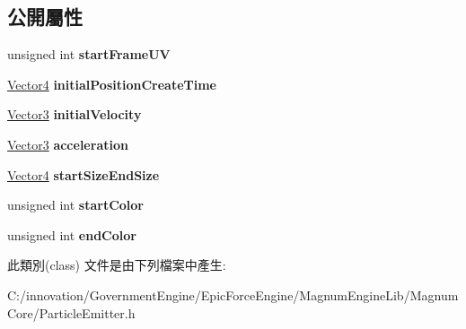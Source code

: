 \subsection*{公開屬性}
\begin{DoxyCompactItemize}
\item 
unsigned int {\bfseries start\+Frame\+UV}\hypertarget{class_i_dream_sky_1_1_particle_emitter_1_1_vertex_a35e593a2585b7fd686b5f96023b52a66}{}\label{class_i_dream_sky_1_1_particle_emitter_1_1_vertex_a35e593a2585b7fd686b5f96023b52a66}

\item 
\hyperlink{class_i_dream_sky_1_1_vector4}{Vector4} {\bfseries initial\+Position\+Create\+Time}\hypertarget{class_i_dream_sky_1_1_particle_emitter_1_1_vertex_aa6390fa25c2c1956a9091a17110c94c7}{}\label{class_i_dream_sky_1_1_particle_emitter_1_1_vertex_aa6390fa25c2c1956a9091a17110c94c7}

\item 
\hyperlink{class_i_dream_sky_1_1_vector3}{Vector3} {\bfseries initial\+Velocity}\hypertarget{class_i_dream_sky_1_1_particle_emitter_1_1_vertex_a4955a6268642f3d4e5f6d89d59910830}{}\label{class_i_dream_sky_1_1_particle_emitter_1_1_vertex_a4955a6268642f3d4e5f6d89d59910830}

\item 
\hyperlink{class_i_dream_sky_1_1_vector3}{Vector3} {\bfseries acceleration}\hypertarget{class_i_dream_sky_1_1_particle_emitter_1_1_vertex_a5f681d0da76ca8b29e2a737a3e263b9a}{}\label{class_i_dream_sky_1_1_particle_emitter_1_1_vertex_a5f681d0da76ca8b29e2a737a3e263b9a}

\item 
\hyperlink{class_i_dream_sky_1_1_vector4}{Vector4} {\bfseries start\+Size\+End\+Size}\hypertarget{class_i_dream_sky_1_1_particle_emitter_1_1_vertex_a28966e0da5d090a688de42fa5a525875}{}\label{class_i_dream_sky_1_1_particle_emitter_1_1_vertex_a28966e0da5d090a688de42fa5a525875}

\item 
unsigned int {\bfseries start\+Color}\hypertarget{class_i_dream_sky_1_1_particle_emitter_1_1_vertex_a7b58c23ce7db81fd93290bd2c12321dd}{}\label{class_i_dream_sky_1_1_particle_emitter_1_1_vertex_a7b58c23ce7db81fd93290bd2c12321dd}

\item 
unsigned int {\bfseries end\+Color}\hypertarget{class_i_dream_sky_1_1_particle_emitter_1_1_vertex_a00f8499f8fad1bce18120ecf80d34f07}{}\label{class_i_dream_sky_1_1_particle_emitter_1_1_vertex_a00f8499f8fad1bce18120ecf80d34f07}

\end{DoxyCompactItemize}


此類別(class) 文件是由下列檔案中產生\+:\begin{DoxyCompactItemize}
\item 
C\+:/innovation/\+Government\+Engine/\+Epic\+Force\+Engine/\+Magnum\+Engine\+Lib/\+Magnum\+Core/Particle\+Emitter.\+h\end{DoxyCompactItemize}
